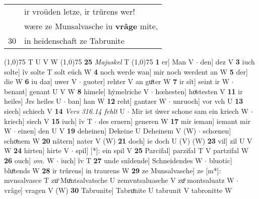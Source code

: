 \documentclass[8pt,a4paper,notitlepage]{article}
\begin{document}
\begin{table}[ht]
\begin{minipage}[t]{0.5\linewidth}
\begin{tabular}{rl}
 & ir vroüden letze, ir trûrens wer!\\ 
 & wære ze Munsalvasche iu \textbf{vrâge} mite,\\ 
30 & in heidenschaft ze Tabrunite\\ 
\end{tabular}
\scriptsize
\line(1,0){75} \newline
T U V W \newline
\line(1,0){75} \newline
\textbf{25} \textit{Majuskel} T  \newline
\line(1,0){75} \newline
\textbf{1} er] Man V  $\cdot$ den] dez V \textbf{3} iuch solte] îv solte T solt eúch W \textbf{4} noch werde wan] mir noch werdent an W \textbf{5} der] die W \textbf{6} iu daz] uwer V  $\cdot$ guoter] rehter V an guͦter W \textbf{7} ir sît] seint ir W  $\cdot$ benant] genant U V W \textbf{8} himele] hẏmelriche V  $\cdot$ hœhesten] hoͤstesten V \textbf{11} ir heiles] Jrs heiles U  $\cdot$ ban] han W \textbf{12} reht] gantzer W  $\cdot$ unruoch] vor vch U \textbf{13} siech] schiech V \textbf{14} \textit{Vers 316.14 fehlt} U   $\cdot$ Mir ist úwer schone sam ein kriech W  $\cdot$ kriech] siech V \textbf{15} iuch] îv T  $\cdot$ des ernern] generen W \textbf{17} mir ieman] iemant mir W  $\cdot$ einen] den U V \textbf{19} deheinen] Dekeine U Deheinem V (W)  $\cdot$ schœnen] schoͤnem W \textbf{20} nâtern] nater V (W) \textbf{21} doch] ie doch U (V) (W) \textbf{23} vil] zil U V W \textbf{24} hirten] hirte V  $\cdot$ spil] [*]: ein spil V \textbf{25} Parcifal] parzifal T V partzifal W \textbf{26} ouch] \textit{om.} W  $\cdot$ iuch] îv T \textbf{27} unde snîdende] Schneidendes W  $\cdot$ bluotic] bluͦtends W \textbf{28} ir trûrens] in traurens W \textbf{29} ze Munsalvasche] ze [m*]: mvnsalvasce T zuͦ Muͦntsalvatsche U zemvntsaluasche V zuͦ montsaluatz W  $\cdot$ vrâge] vragen V (W) \textbf{30} Tabrunite] Tabruͦnite U tabrunit V tabronitte W \newline
\end{minipage}
\end{table}
\end{document}
